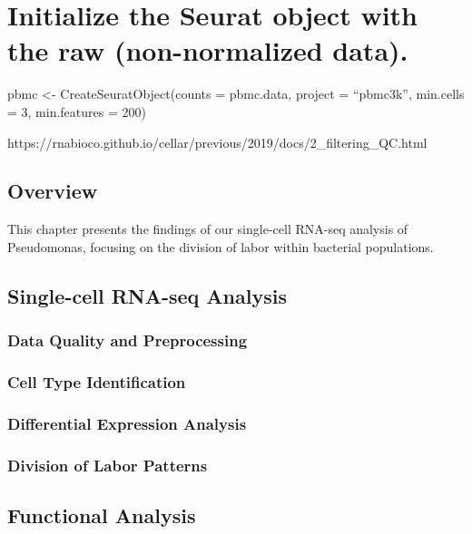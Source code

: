 \documentclass[
  11pt,
  a4paper,
]{report}
\begin{document}
\chapter{Initialize the Seurat object with the raw (non-normalized
data).}\label{initialize-the-seurat-object-with-the-raw-non-normalized-data.}

pbmc \textless- CreateSeuratObject(counts = pbmc.data, project =
``pbmc3k'', min.cells = 3, min.features = 200)

https://rnabioco.github.io/cellar/previous/2019/docs/2\_filtering\_QC.html

\section{Overview}\label{overview}

This chapter presents the findings of our single-cell RNA-seq analysis
of Pseudomonas, focusing on the division of labor within bacterial
populations.

\section{Single-cell RNA-seq
Analysis}\label{single-cell-rna-seq-analysis}

\subsection{Data Quality and
Preprocessing}\label{data-quality-and-preprocessing}

\subsection{Cell Type Identification}\label{cell-type-identification}

\subsection{Differential Expression
Analysis}\label{differential-expression-analysis}

\subsection{Division of Labor
Patterns}\label{division-of-labor-patterns}

\section{Functional Analysis}\label{functional-analysis}
\end{document}
